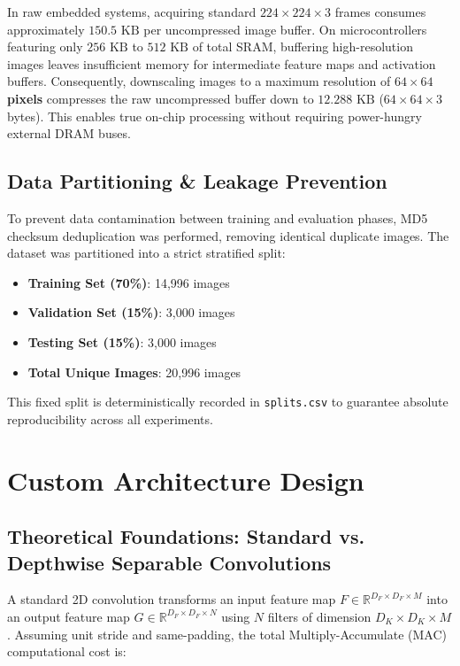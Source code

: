 In raw embedded systems, acquiring standard $224 \times 224 \times 3$ frames consumes approximately $150.5\text{ KB}$ per uncompressed image buffer. On microcontrollers featuring only $256\text{ KB}$ to $512\text{ KB}$ of total SRAM, buffering high-resolution images leaves insufficient memory for intermediate feature maps and activation buffers. Consequently, downscaling images to a maximum resolution of \textbf{$64 \times 64$ pixels} compresses the raw uncompressed buffer down to \textbf{$12.288\text{ KB}$} ($64 \times 64 \times 3$ bytes). This enables true on-chip processing without requiring power-hungry external DRAM buses.

\subsection{Data Partitioning \& Leakage Prevention}

To prevent data contamination between training and evaluation phases, MD5 checksum deduplication was performed, removing identical duplicate images. The dataset was partitioned into a strict stratified split:

\begin{itemize}
    \item \textbf{Training Set (70\%)}: 14,996 images
    \item \textbf{Validation Set (15\%)}: 3,000 images
    \item \textbf{Testing Set (15\%)}: 3,000 images
    \item \textbf{Total Unique Images}: 20,996 images
\end{itemize}

This fixed split is deterministically recorded in \texttt{splits.csv} to guarantee absolute reproducibility across all experiments.

\section{Custom Architecture Design}

\subsection{Theoretical Foundations: Standard vs. Depthwise Separable Convolutions}

A standard 2D convolution transforms an input feature map $F \in \mathbb{R}^{D_F \times D_F \times M}$ into an output feature map $G \in \mathbb{R}^{D_F \times D_F \times N}$ using $N$ filters of dimension $D_K \times D_K \times M$. Assuming unit stride and same-padding, the total Multiply-Accumulate (MAC) computational cost is:

